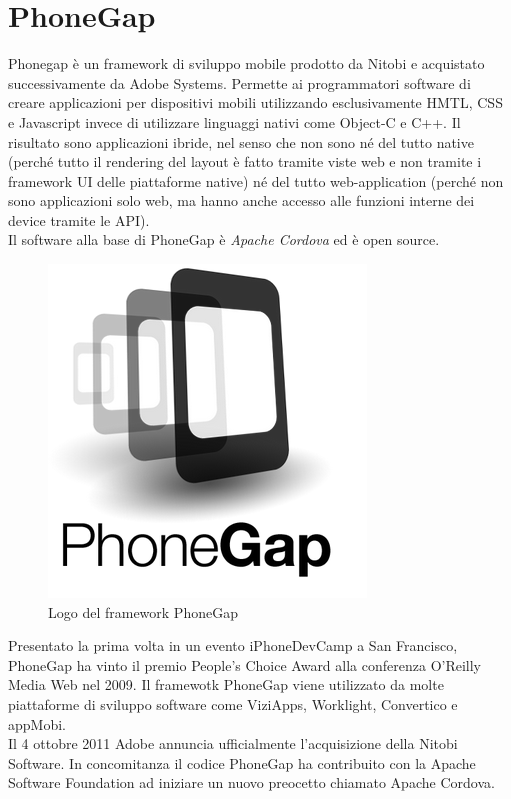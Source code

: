 \section{PhoneGap}
\label{phonegap}
Phonegap è un framework di sviluppo mobile prodotto da Nitobi e acquistato successivamente da Adobe Systems. Permette ai programmatori software di creare applicazioni per dispositivi mobili utilizzando esclusivamente HMTL, CSS e Javascript invece di utilizzare linguaggi nativi come Object-C e C++. Il risultato sono applicazioni ibride, nel senso che non sono né del tutto native (perché tutto il rendering del layout è fatto tramite viste web e non tramite i framework UI delle piattaforme native) né del tutto web-application (perché non sono applicazioni solo web, ma hanno anche accesso alle funzioni interne dei device tramite le API). \\
Il software alla base di PhoneGap è \textit{Apache Cordova} ed è open source. \\
\begin{figure}[H]
	\centering
	\includegraphics[scale=0.6]{Implementazione/logo_phonegap.png}
	\caption{Logo del framework PhoneGap}
	\label{fig:logo_phonegap}
\end{figure}
Presentato la prima volta in un evento iPhoneDevCamp a San Francisco, PhoneGap ha vinto il premio People's Choice Award alla conferenza O'Reilly Media Web nel 2009. Il framewotk PhoneGap viene utilizzato da molte piattaforme  di sviluppo software come ViziApps, Worklight, Convertico e appMobi. \\
Il 4 ottobre 2011 Adobe annuncia ufficialmente l'acquisizione della Nitobi Software. In concomitanza il codice PhoneGap ha contribuito con la Apache Software Foundation ad iniziare un nuovo preocetto chiamato Apache Cordova.
